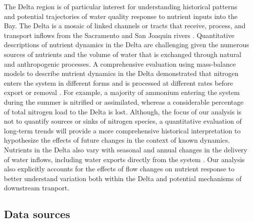 \documentclass[letterpaper,12pt,oneside]{article}\usepackage[]{graphicx}\usepackage[]{color}
\begin{document}
The Delta region is of particular interest for understanding historical patterns and potential trajectories of water quality response to nutrient inputs into the Bay.  The Delta is a mosaic of linked channels or tracts that receive, process, and transport inflows from the Sacramento and San Joaquin rivers \citep{Jassby00,Jassby08,Novick15}.  Quantitative descriptions of nutrient dynamics in the Delta are challenging given the numerous sources of nutrients and the volume of water that is exchanged through natural and anthropogenic processes.  A comprehensive evaluation using mass-balance models to describe nutrient dynamics in the Delta demonstrated that nitrogen enters the system in different forms and is processed at different rates before export or removal \citep{Novick15}. For example, a majority of ammonium entering the system during the summer is nitrified or assimilated, whereas a considerable percentage of total nitrogen load to the Delta is lost.  Although, the focus of our analysis is not to quantify sources or sinks of nitrogen species, a quantitative evaluation of long-term trends will provide a more comprehensive historical interpretation to hypothesize the effects of future changes in the context of known dynamics.  Nutrients in the Delta also vary with seasonal and annual changes in the delivery of water inflows, including water exports directly from the system \citep{Jassby00,Jassby08}.  Our analysis also explicitly accounts for the effects of flow changes on nutrient response to better understand variation both within the Delta and potential mechanisms of downstream tranport. 

\subsection{Data sources}
\end{document}
